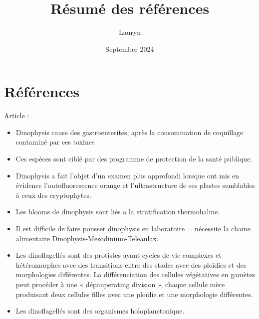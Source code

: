 \documentclass{article}
\title{Résumé des références}
\author{Lauryn}
\date{September 2024}
\begin{document}
\maketitle
\section{Références}
Article \cite{reguera2024dinophysis}:
\begin{itemize}
    \item Dinophysis cause des gastroenterites, après la consommation de coquillage contaminé par ces toxines
    \item Ces espèces sont ciblé par des programme de protection de la santé publique.
\end{itemize}
\begin{itemize}
    \item Dinophysis a fait l'objet d'un examen plus approfondi lorsque ont mis en évidence l'autoﬂuorescence orange et l'ultrastructure de ses plastes semblables à ceux des cryptophytes.
\end{itemize}
\begin{itemize}
    \item Les blooms de dinophysis sont liés a la stratification thermohaline. 
\end{itemize}
\begin{itemize}
    \item Il est difficile de faire pousser dinophysis en laboratoire = nécessite la chaine alimentaire Dinophysis-Mesodinium-Teleaulax.
\end{itemize}
\begin{itemize}
    \item Les dinoﬂagellés sont des protistes ayant cycles de vie complexes et hétéromorphes avec des transitions entre des stades avec des ploïdies et des morphologies différentes. La différenciation des cellules végétatives en gamètes peut procéder à une « dépauperating division », chaque cellule mère produisant deux cellules filles avec une ploïdie et une morphologie différentes.
\end{itemize}
\begin{itemize}
    \item Les dinoflagellés sont des organismes holoplanctonique. 
\end{itemize}
\end{document}
